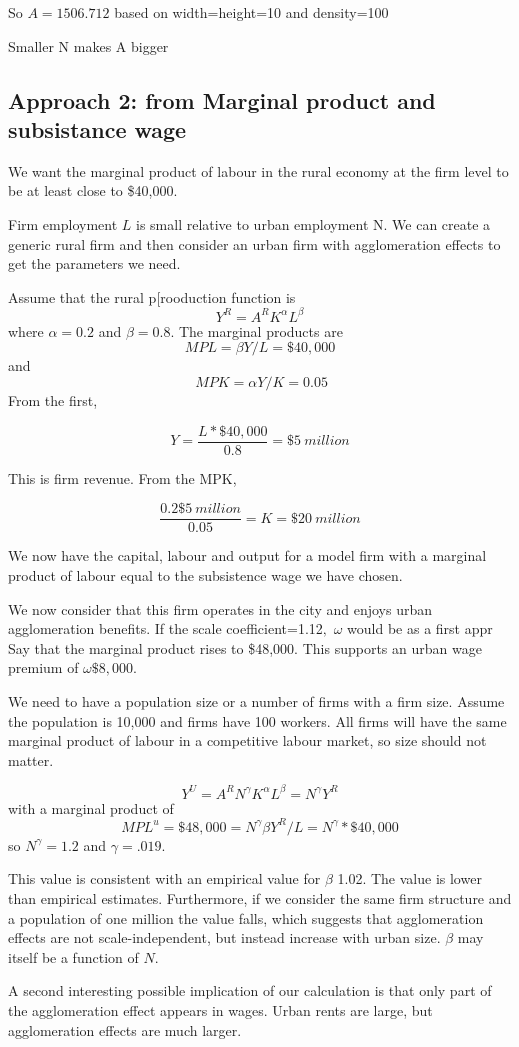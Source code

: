 {\Large So $A = 1506.712$ based on width=height=10 and density=100}  

Smaller N makes A bigger


\subsection{Approach 2: from Marginal product and subsistance wage}
We want the marginal product of labour in the rural economy at the firm level to be at least close to \$40,000.

Firm employment $L$ is small relative to  urban employment {N}.  We can create a generic rural firm and then consider an urban firm with agglomeration effects to get the parameters we need. 

Assume that the rural p[rooduction function is 
\[Y^R=A^R K^\alpha L^\beta\]
where $\alpha=0.2$  and $\beta=0.8$. The marginal products are 
\[MPL=\beta Y/L=\$40,000\] and\[\ MPK=\alpha Y/K =0.05\]
From the first, 

\[Y=\frac{L*\$40,000}{0.8}=\$5\ million\]

This is firm revenue. From the MPK, 

\[ \frac{0.2 \$5\ million}{0.05}=K =\$20\ million \]

We now have the capital, labour and output for a model firm with a marginal product of labour  equal to the subsistence wage we have chosen.

We now consider that this firm operates in the city and enjoys  urban agglomeration benefits.  If the scale coefficient=1.12$,$ $\omega$ would be as a first appr Say that the marginal product rises to \$48,000. This supports an urban wage premium of $\omega\$8,000$.

We need to have a population size or a number of firms with a firm size. Assume the population is 10,000 and firms have 100 workers. All firms will have the same marginal product of labour in a competitive labour market, so size should not matter. 

\[Y^U=A^R N^\gamma K^\alpha L^\beta = N^\gamma Y^R\]
with a marginal product of 
\[MPL^u=\$48,000=N^\gamma \beta Y^R/L=N^\gamma *\$40,000\]
so $N^\gamma=1.2$ and $\gamma = .019$. 


This value is consistent with an empirical  value for $\beta$   1.02. The value is lower than empirical estimates. Furthermore, if we consider the same firm structure and a population of one million the value falls, which suggests that agglomeration effects are not scale-independent, but instead increase with urban size. $\beta$ may itself be a function of $N$.

A second interesting possible implication of our calculation is that only part of the agglomeration effect appears in wages. Urban rents  are large, but agglomeration effects are much larger.


 

